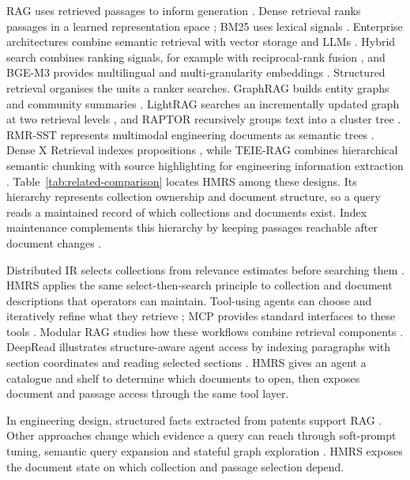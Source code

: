 RAG uses retrieved passages to inform generation \citep{rag-lewis}. Dense
retrieval ranks passages in a learned representation space \citep{dpr}; BM25
uses lexical signals \citep{bm25}. Enterprise architectures combine semantic
retrieval with vector storage and LLMs \citep{ghali-kbs-retrieval-2025}.
Hybrid search combines ranking signals, for example with reciprocal-rank
fusion \citep{rrf-cormack}, and BGE-M3 provides multilingual and
multi-granularity embeddings \citep{bge-m3}. Structured retrieval organises
the units a ranker searches. GraphRAG builds entity graphs and community
summaries \citep{graphrag}. LightRAG searches an incrementally updated
graph at two retrieval levels \citep{lightrag}, and RAPTOR recursively
groups text into a cluster tree \citep{raptor}. RMR-SST represents multimodal engineering
documents as semantic trees \citep{li-kbs-rmrsst-2026}. Dense X Retrieval
indexes propositions \citep{chen2024dense}, while TEIE-RAG combines
hierarchical semantic chunking with source highlighting for engineering
information extraction \citep{shen-kbs-teierag-2026}.
Table~\ref{tab:related-comparison} locates HMRS among these designs. Its
hierarchy represents collection ownership and document structure, so a
query reads a maintained record of which collections and documents exist.
Index maintenance complements this hierarchy by keeping passages reachable
after document changes \citep{xu2023spfresh}.

Distributed IR selects collections from relevance estimates before searching
them \citep{callan1995searching,si2003redde}. HMRS applies the same
select-then-search principle to collection and document descriptions that
operators can maintain. Tool-using agents can choose and iteratively refine
what they retrieve \citep{react-yao,toolformer}; MCP provides standard
interfaces to these tools \citep{mcp}. Modular RAG studies how these
workflows combine retrieval components \citep{modular-rag}. DeepRead
illustrates structure-aware agent access by indexing paragraphs with section
coordinates and reading selected sections \citep{deepread}. HMRS gives
an agent a catalogue and shelf to determine which documents to open, then
exposes document and passage access through the same tool layer.

In engineering design, structured facts extracted from patents support RAG
\citep{siddharth2024retrieval}. Other approaches change which evidence a
query can reach through soft-prompt tuning, semantic query expansion and
stateful graph exploration
\citep{peng2024soft,massai2023evaluatio,tao2025fine}. HMRS exposes the document
state on which collection and passage selection depend.


